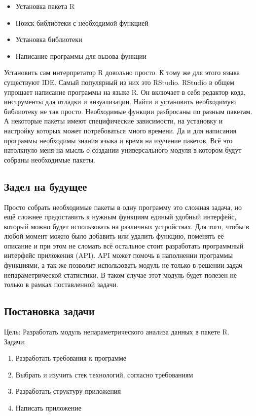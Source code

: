 \documentclass[14pt,a4paper]{scrartcl}
\begin{document}
    \begin{itemize}[noitemsep]
        \item Установка пакета R
        \item Поиск библиотеки с необходимой функцией
        \item Установка библиотеки
        \item Написание программы для вызова функции
    \end{itemize}

    Установить сам интерпретатор R довольно просто. К тому же для этого языка существуют IDE. Самый популярный из них это RStudio. RStudio в общем упрощает написание программы на языке R. Он включает в себя редактор кода, инструменты для отладки и визуализации. Найти и установить необходимую библиотеку не так просто. Необходимые функции разбросаны по разным пакетам. А некоторые пакеты имеют специфические зависимости, на установку и настройку которых может потребоваться много времени. Да и для написания программы необходимы знания языка и время на изучение пакетов. Всё это натолкнуло меня на мысль о создании универсального модуля в котором будут собраны необходимые пакеты.

    \subsection[Задел на будущее]{Задел на будущее}
    Просто собрать необходимые пакеты в одну программу это сложная задача, но ещё сложнее предоставить к нужным функциям единый удобный интерфейс, который можно будет использовать на различных устройствах. Для того, чтобы в любой момент можно было добавить или удалить функцию, поменять её описание и при этом не сломать всё остальное стоит разработать программный интерфейс приложения (API). API может помочь в наполнении программы функциями, а так же позволит использовать модуль не только в решении задач непараметрической статистики. В таком случае этот модуль будет полезен не только в рамках поставленной задачи.

    \subsection{Постановка задачи}
    \noindent Цель: Разработать модуль непараметрического анализа данных в пакете R.
	\noindent Задачи:
    \begin{enumerate}
        \item Разработать требования к программе
        \item Выбрать и изучить стек технологий, согласно требованиям
        \item Разработать структуру приложения
        \item Написать приложение
    \end{enumerate}
\end{document}
